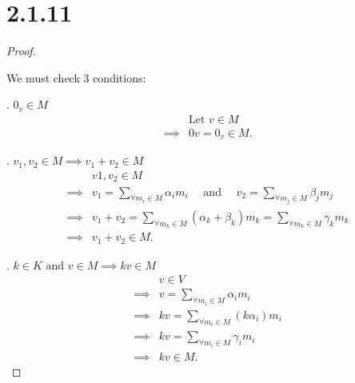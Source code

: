 \documentclass{article}
\begin{document}
\section*{2.1.11}
\begin{proof}
  $ $

  We must check 3 conditions:

  . $0_v \in M$
  \begin{align*}
    &\text{Let } v \in M \\
    \implies& 0v = 0_v \in M.
  \end{align*}

  . $v_1, v_2 \in M \implies v_1 + v_2 \in M$
  \begin{align*}
    &v1, v_2 \in M \\
    \implies& 
    v_1 = \sum_{\forall m_i \in M} \alpha_i m_i 
    \quad \text{ and } \quad
    v_2 = \sum_{\forall m_j \in M} \beta_j m_j \\
    \implies& v_1 + v_2 = \sum_{\forall m_k \in M} (\alpha_k + \beta_k) m_k 
    =
    \sum_{\forall m_k \in M} \gamma_k m_k \\
    \implies& v_1 + v_2 \in M.
  \end{align*}

  . $k \in K$ and $v \in M \implies kv \in M$
  \begin{align*}
    &v \in V \\
    \implies& v = \sum_{\forall m_i \in M} \alpha_i m_i  \\
    \implies& kv = \sum_{\forall m_i \in M} (k\alpha_i) m_i  \\
    \implies& kv = \sum_{\forall m_i \in M} \gamma_i m_i  \\
    \implies& kv \in M.
  \end{align*}

\end{proof}

\newpage
\end{document}
